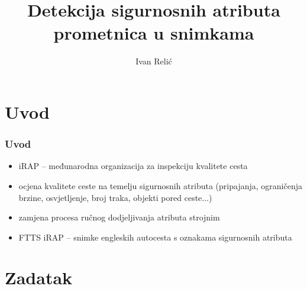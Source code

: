 \documentclass{beamer}
\author{Ivan Relić}
\title[Sveučilište u Zagrebu, FER]{Detekcija sigurnosnih atributa prometnica u snimkama}
\begin{document}
\begin{frame}
\titlepage 
\end{frame}

\section{Uvod}

\begin{frame}
\frametitle{Uvod}
\begin{itemize}
\item iRAP -- međunarodna organizacija za inspekciju kvalitete cesta
\item ocjena kvalitete ceste na temelju sigurnosnih atributa (pripajanja, ograničenja brzine, osvjetljenje, broj traka, objekti pored ceste...)
\item zamjena procesa ručnog dodjeljivanja atributa strojnim
\item FTTS iRAP -- snimke engleskih autocesta s oznakama sigurnosnih atributa
 \end{itemize}

\end{frame}

\section{Zadatak}
\end{document}
